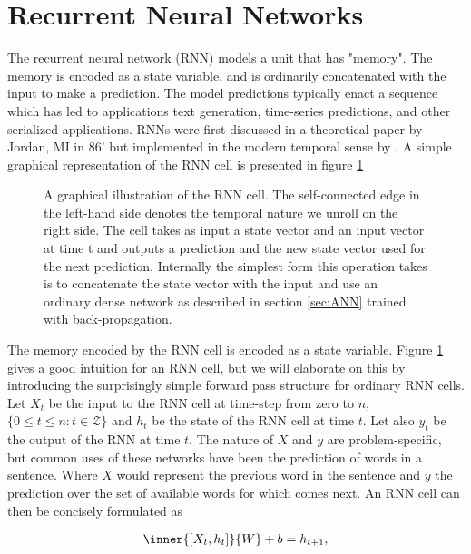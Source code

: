 
\section{Recurrent Neural Networks}\label{sec:rnn}

The recurrent neural network (RNN) models a unit that has "memory". The memory is encoded as a state variable, and is ordinarily concatenated with the input to make a prediction. The model predictions typically enact a sequence which has led to applications text generation, time-series predictions, and other serialized applications. RNNs were first discussed in a theoretical paper by Jordan, MI in 86' but implemented in the modern temporal sense by \citet{Pearlmutter1989}. A simple graphical representation of the RNN cell is presented in figure \ref{fig:rnn}

\begin{figure}[h]
\centering
{} %

\caption[Recurrent neural network cell]{A graphical illustration of the RNN cell. The self-connected edge in the left-hand side denotes the temporal nature we unroll on the right side. The cell takes as input a state vector and an input vector at time t and outputs a prediction and the new state vector used for the next prediction. Internally the simplest form this operation takes is to concatenate the state vector with the input and use an ordinary dense network as described in section \ref{sec:ANN} trained with back-propagation.}\label{fig:rnn}
\end{figure}

The memory encoded by the RNN cell is encoded as a state variable. Figure \ref{fig:rnn} gives a good intuition for an RNN cell, but we will elaborate on this by introducing the surprisingly simple forward pass structure for ordinary RNN cells. Let $X_t$ be the input to the RNN cell at time-step from zero to $n$, $\{0 \leq t \leq n: t \in \mathcal{Z} \}$ and $h_t$ be the state of the RNN cell at time $t$. Let also $y_t$ be the output of the RNN at time $t$. The nature of $X$ and $y$ are problem-specific, but common uses of these networks have been the prediction of words in a sentence. Where $X$ would represent the previous word in the sentence and $y$ the prediction over the set of available words for which comes next. An RNN cell can then be concisely formulated as

\begin{align}\label{eq:rnn}
\inner{[X_t, h_t]}{W} + b = h_{t+1},
\end{align}


